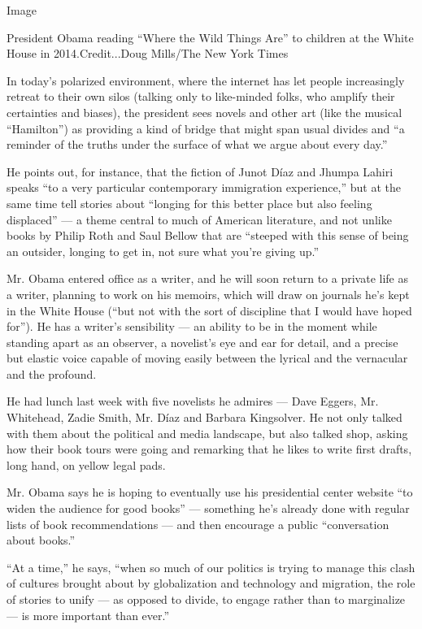 Image

President Obama reading ``Where the Wild Things Are'' to children at the
White House in 2014.Credit...Doug Mills/The New York Times

In today's polarized environment, where the internet has let people
increasingly retreat to their own silos (talking only to like-minded
folks, who amplify their certainties and biases), the president sees
novels and other art (like the musical ``Hamilton'') as providing a kind
of bridge that might span usual divides and ``a reminder of the truths
under the surface of what we argue about every day.''

He points out, for instance, that the fiction of Junot Díaz and Jhumpa
Lahiri speaks ``to a very particular contemporary immigration
experience,'' but at the same time tell stories about ``longing for this
better place but also feeling displaced'' --- a theme central to much of
American literature, and not unlike books by Philip Roth and Saul Bellow
that are ``steeped with this sense of being an outsider, longing to get
in, not sure what you're giving up.''

Mr. Obama entered office as a writer, and he will soon return to a
private life as a writer, planning to work on his memoirs, which will
draw on journals he's kept in the White House (``but not with the sort
of discipline that I would have hoped for''). He has a writer's
sensibility --- an ability to be in the moment while standing apart as
an observer, a novelist's eye and ear for detail, and a precise but
elastic voice capable of moving easily between the lyrical and the
vernacular and the profound.

He had lunch last week with five novelists he admires --- Dave Eggers,
Mr. Whitehead, Zadie Smith, Mr. Díaz and Barbara Kingsolver. He not only
talked with them about the political and media landscape, but also
talked shop, asking how their book tours were going and remarking that
he likes to write first drafts, long hand, on yellow legal pads.

Mr. Obama says he is hoping to eventually use his presidential center
website ``to widen the audience for good books'' --- something he's
already done with regular lists of book recommendations --- and then
encourage a public ``conversation about books.''

``At a time,'' he says, ``when so much of our politics is trying to
manage this clash of cultures brought about by globalization and
technology and migration, the role of stories to unify --- as opposed to
divide, to engage rather than to marginalize --- is more important than
ever.''

